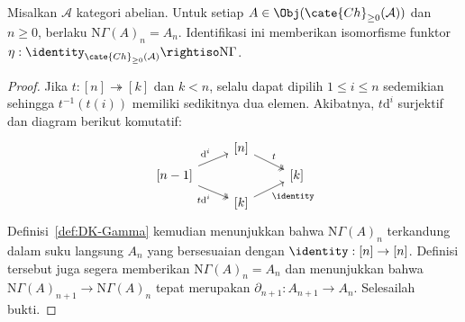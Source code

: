 \begin{lemma}\label{prop:DK-N-unit}
	Misalkan $\mathcal{A}$ kategori abelian. Untuk setiap
	$A\in\Obj(\cate{Ch}_{\geq0}(\mathcal{A}))$ dan $n\geq0$, berlaku
	$\mathrm{N}\Gamma(A)_n=A_n$. Identifikasi ini memberikan isomorfisme funktor
	$\eta:\identity_{\cate{Ch}_{\geq0}(\mathcal{A})}\rightiso
	\mathrm{N}\Gamma$.
\end{lemma}
\begin{proof}
	Jika $t:[n]\twoheadrightarrow[k]$ dan $k<n$, selalu
	dapat dipilih $1\leq i\leq n$ sedemikian sehingga
	$t^{-1}(t(i))$ memiliki sedikitnya dua elemen. Akibatnya,
	$t\mathrm{d}^i$ surjektif dan diagram berikut komutatif:
	\[\begin{tikzcd}[row sep=tiny]
		& {[n]} \arrow[twoheadrightarrow, rd, "t"] & \\
		{[n-1]} \arrow[ru, "{\mathrm{d}^i}"] \arrow[twoheadrightarrow, rd, "{t\mathrm{d}^i}"'] & & {[k]} \\
		& {[k]} \arrow[ru, "{\identity}"'] &
	\end{tikzcd}\]
	Definisi~\ref{def:DK-Gamma} kemudian menunjukkan bahwa
	$\mathrm{N}\Gamma(A)_n$ terkandung dalam suku langsung $A_n$ yang
	bersesuaian dengan $\identity:[n]\to[n]$. Definisi tersebut juga segera
	memberikan $\mathrm{N}\Gamma(A)_n=A_n$ dan menunjukkan bahwa
	$\mathrm{N}\Gamma(A)_{n+1}\to\mathrm{N}\Gamma(A)_n$ tepat merupakan
	$\partial_{n+1}:A_{n+1}\to A_n$. Selesailah bukti.
\end{proof}

